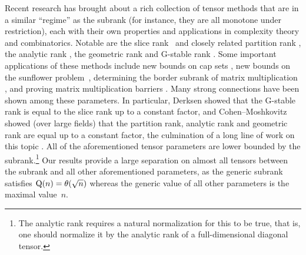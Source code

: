 \documentclass[11pt]{article}
\theoremstyle{definition}
\theoremstyle{remark}
\newcommand{\gensubrank}{{\rm Q}}
\begin{document}
Recent research has brought about a rich collection of tensor methods that are in a similar ``regime'' as the subrank (for instance, they are all monotone under restriction), each with their own properties and applications in complexity theory and combinatorics. Notable are the slice rank~\cite{tao} and closely related partition rank \cite{naslund2017multi}, the analytic rank \cite{MR2773103,lovett2019analytic,bhrushundi2018multilinear}, the geometric rank \cite{DBLP:conf/coco/KoppartyMZ20, geng2021geometry} and G-stable rank \cite{derksen2020gstable}. Some important applications of these methods include new bounds on cap sets \cite{tao,MR3583358}, new bounds on the sunflower problem~\cite{MR3668469}, determining the border subrank of matrix multiplication \cite{DBLP:conf/coco/KoppartyMZ20}, and proving matrix multiplication barriers \cite{DBLP:journals/corr/BlasiakCCGU16,DBLP:conf/coco/Alman19,DBLP:conf/coco/ChristandlVZ19}. Many strong connections have been shown among these parameters. In particular, Derksen \cite{derksen2020gstable} showed that the G-stable rank is equal to the slice rank up to a constant factor, and Cohen--Moshkovitz \cite{DBLP:conf/stoc/CohenM21,cohen2021partition} showed (over large fields) that the partition rank, analytic rank and geometric rank are equal up to a constant factor, the culmination of a long line of work on this topic \cite{DBLP:journals/cdm/GreenT09,DBLP:conf/focs/KaufmanL08,bhowmick2015bias,janzer2018low,janzer2019polynomial,milicevic2019polynomial}.
All of the aforementioned tensor parameters are lower bounded by the subrank.\footnote{The analytic rank requires a natural normalization for this to be true, that is, one should normalize it by the analytic rank of a full-dimensional diagonal tensor.} Our results provide a large separation on almost all tensors between the subrank and all other aforementioned parameters, as the generic subrank satisfies $\gensubrank(n) = \theta(\sqrt{n})$ whereas the generic value of all other parameters is the maximal value~$n$.
\end{document}
